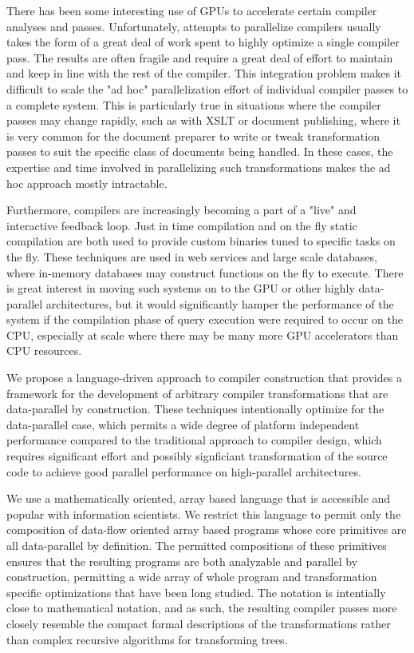 \documentclass[pldi]{sigplanconf-pldi15}
\begin{document}
There has been some interesting use of GPUs to accelerate certain compiler analyses and passes. 
Unfortunately, attempts to parallelize compilers usually takes the form of a great deal of work spent to 
highly optimize a single compiler pass. The results are often fragile and require a great deal of effort 
to maintain and keep in line with the rest of the compiler. This integration problem makes it difficult to 
scale the "ad hoc" parallelization effort of individual compiler passes to a complete system. This is 
particularly true in situations where the compiler passes may change rapidly, such as with XSLT or 
document publishing, where it is very common for the document preparer to write or tweak transformation 
passes to suit the specific class of documents being handled. In these cases, the expertise and time 
involved in parallelizing such transformations makes the ad hoc approach mostly intractable. 

Furthermore, compilers are increasingly becoming a part of a "live" and interactive feedback loop. 
Just in time compilation and on the fly static compilation are both used to provide custom binaries tuned 
to specific tasks on the fly. These techniques are used in web services and large scale databases, where 
in-memory databases may construct functions on the fly to execute. There is great interest in moving 
such systems on to the GPU or other highly data-parallel architectures, but it would significantly hamper 
the performance of the system if the compilation phase of query execution were required to occur on the 
CPU, especially at scale where there may be many more GPU accelerators than CPU resources. 

We propose a language-driven approach to compiler construction that provides a framework for the 
development of arbitrary compiler transformations that are data-parallel by construction. These 
techniques intentionally optimize for the data-parallel case, which permits a wide degree of platform 
independent performance compared to the traditional approach to compiler design, which requires 
significant effort and possibly signficiant transformation of the source code to achieve good parallel 
performance on high-parallel architectures. 

We use a mathematically oriented, array based language that is accessible and popular with information 
scientists. We restrict this language to permit only the composition of data-flow oriented array based 
programs whose core primitives are all data-parallel by definition. The permitted compositions of these 
primitives ensures that the resulting programs are both analyzable and parallel by construction, permitting 
a wide array of whole program and transformation specific optimizations that have been long studied. 
The notation is intentially close to mathematical notation, and as such, the resulting compiler passes 
more closely resemble the compact formal descriptions of the transformations rather than complex 
recursive algorithms for transforming trees. 
\end{document}
